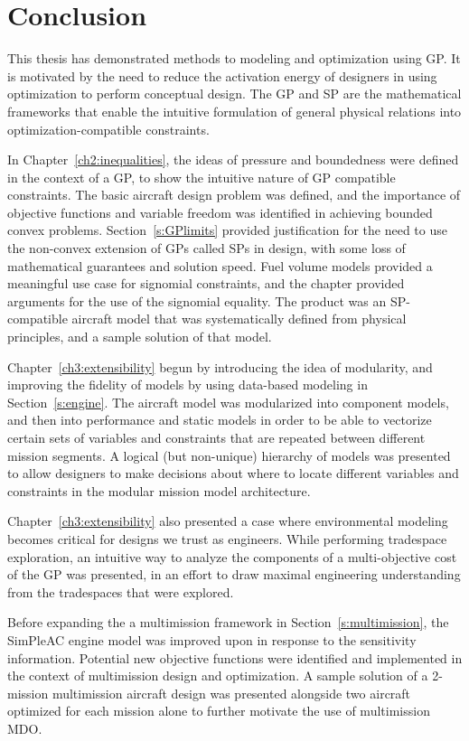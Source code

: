 \chapter{Conclusion}
\label{ch5:conclusion}

This thesis has demonstrated methods to modeling and optimization using \gls{GP}. It
is motivated by the need to reduce the activation energy of designers in using
optimization to perform conceptual design. The \gls{GP} and \gls{SP} are the
mathematical frameworks that enable the intuitive formulation of general
physical relations into optimization-compatible constraints.

In Chapter~\ref{ch2:inequalities}, the ideas of pressure and boundedness were
defined in the context of a \gls{GP}, to show the intuitive nature of \gls{GP}
compatible constraints. The basic aircraft design problem was defined,
and the importance of objective functions and variable freedom
was identified in achieving bounded convex problems.
Section~\ref{s:GPlimits} provided justification for the need to use the non-convex
extension of \gls{GP}s called \gls{SP}s in design, with some loss of mathematical
guarantees and solution speed. Fuel volume models provided a meaningful use
case for signomial constraints, and the chapter provided arguments for the use of the signomial
equality. The product was an \gls{SP}-compatible aircraft model that was systematically defined from
physical principles, and a sample solution of that model.

Chapter~\ref{ch3:extensibility} begun by introducing the idea of modularity, and improving
the fidelity of models by using data-based modeling in Section~\ref{s:engine}.
The aircraft model was modularized
into component models, and then into performance and static models in order to
be able to vectorize certain sets of variables and constraints that are repeated between
different mission segments. A logical (but non-unique) hierarchy of models
was presented to allow designers to make decisions about where to locate different variables
and constraints in the modular mission model architecture.

Chapter~\ref{ch3:extensibility} also presented a case where environmental modeling becomes critical
for designs we trust as engineers. While performing tradespace exploration, an intuitive
way to analyze the components of a multi-objective cost of the \gls{GP} was presented, in
an effort to draw maximal engineering understanding from the tradespaces that were explored.

Before expanding the a multimission framework in Section~\ref{s:multimission},
the SimPleAC engine model was improved upon
in response to the sensitivity information. Potential
new objective functions were identified and implemented in the context of multimission design
and optimization.
A sample solution of a 2-mission multimission aircraft design
was presented alongside two aircraft optimized for each mission alone to further motivate
the use of multimission \gls{MDO}.

